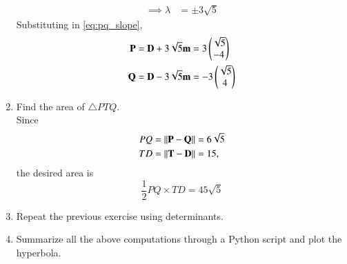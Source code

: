 \begin{enumerate}[label=\arabic*.,ref=\thesubsection.\theenumi]
\begin{align}
\\
\implies
\lambda &= \pm 3\sqrt{5}
\end{align}
%
Substituting in \eqref{eq:pq_slope},
\begin{align}
\mathbf{P} &= \mathbf{D}+ 3\sqrt{5} \mathbf{m} = 3 \begin{pmatrix} \sqrt{5} \\ -4\end{pmatrix}
\\
\mathbf{Q} &= \mathbf{D}- 3\sqrt{5} \mathbf{m} = -3 \begin{pmatrix} \sqrt{5} \\ 4\end{pmatrix}
\end{align}
%
\item Find the area of $\triangle PTQ$.
\\
\solution Since
\begin{align}
PQ &= \left\lVert\mathbf{P}-\mathbf{Q}\right\rVert = 6\sqrt{5}
\\
TD &= \left\lVert\mathbf{T}-\mathbf{D}\right\rVert = 15,
\end{align}
the desired area is
\begin{equation}
\frac{1}{2}PQ \times TD = 45 \sqrt{5}
\end{equation}
\item Repeat the previous exercise using determinants.
\item Summarize all the above computations through a Python script and plot 
the hyperbola.
\end{enumerate}
